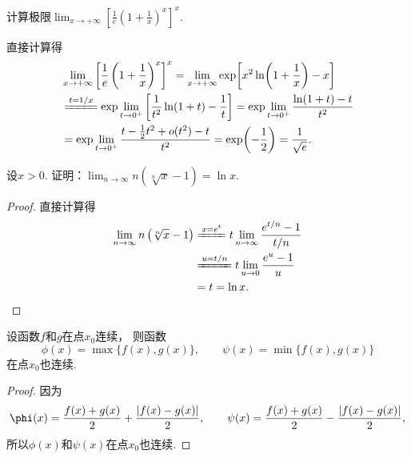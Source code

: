\begin{example}
计算极限\(\lim_{x\to+\infty} \left[ \frac1e \left(1+\frac1x\right)^x \right]^x\).
\begin{solution}
直接计算得\begin{align*}
	&\lim_{x\to+\infty} \left[ \frac1e \left(1+\frac1x\right)^x \right]^x
	= \lim_{x\to+\infty} \exp[x^2 \ln(1+\frac1x) - x] \\
	&\xlongequal{t=1/x} \exp\lim_{t\to0^+} \left[ \frac1{t^2} \ln(1+t) - \frac1t \right]
	= \exp\lim_{t\to0^+} \frac{\ln(1+t)-t}{t^2} \\
	&= \exp\lim_{t\to0^+} \frac{t-\frac12t^2+o(t^2)-t}{t^2}
	= \exp(-\frac12)
	= \frac1{\sqrt{e}}.
\end{align*}
\end{solution}
\end{example}

\begin{example}
设\(x>0\).
证明：\(\lim_{n\to\infty} n \left( \sqrt[n]{x} - 1 \right) = \ln x\).
\begin{proof}
直接计算得\begin{align*}
	\lim_{n\to\infty} n \left( \sqrt[n]{x} - 1 \right)
	&\xlongequal{x = e^t} t \lim_{n\to\infty} \frac{e^{t/n} - 1}{t/n} \\
	&\xlongequal{u=t/n} t \lim_{u\to0} \frac{e^u - 1}u \\
	&= t
	= \ln x.
	\qedhere
\end{align*}
\end{proof}
\end{example}

\begin{proposition}
设函数\(f\)和\(g\)在点\(x_0\)连续，
则函数\begin{equation*}
	\phi(x) = \max\{f(x),g(x)\}, \qquad
	\psi(x) = \min\{f(x),g(x)\}
\end{equation*}在点\(x_0\)也连续.
\begin{proof}
因为\begin{equation*}
	\phi(x)
	= \frac{f(x)+g(x)}{2}+\frac{\abs{f(x)-g(x)}}{2}, \qquad
	\psi(x)
	= \frac{f(x)+g(x)}{2}-\frac{\abs{f(x)-g(x)}}{2},
\end{equation*}
所以\(\phi(x)\)和\(\psi(x)\)在点\(x_0\)也连续.
\end{proof}
\end{proposition}

